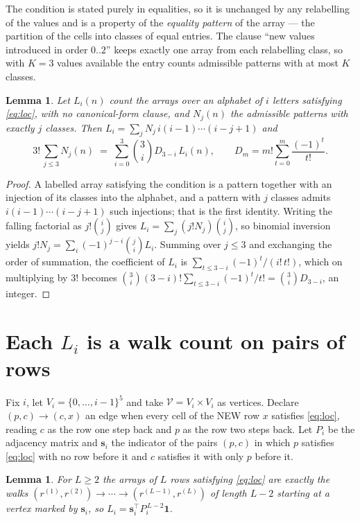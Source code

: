 \documentclass[11pt,a4paper]{article}
\theoremstyle{plain}
\newtheorem{lemma}[theorem]{Lemma}
\theoremstyle{definition}
\begin{document}
The condition is stated purely in equalities, so it is unchanged by any relabelling of the
values and is a property of the \emph{equality pattern} of the array --- the partition of
the cells into classes of equal entries. The clause ``new values introduced in order
$0..2$'' keeps exactly one array from each relabelling class, so with $K=3$ values
available the entry counts admissible patterns with at most $K$ classes.

\begin{lemma}\label{lem:inv}
Let $L_i(n)$ count the arrays over an alphabet of $i$ letters satisfying \eqref{eq:loc},
with no canonical-form clause, and $N_j(n)$ the admissible patterns with exactly $j$ classes.
Then $L_i=\sum_j N_j\,i(i-1)\cdots(i-j+1)$ and
\[
3!\,\sum_{j\le 3}N_j(n)\;=\;\sum_{i=0}^{3}\binom{3}{i}D_{3-i}\,L_i(n),
\qquad D_m=m!\sum_{t=0}^{m}\frac{(-1)^t}{t!} .
\]
\end{lemma}

\begin{proof}
A labelled array satisfying the condition is a pattern together with an injection of its
classes into the alphabet, and a pattern with $j$ classes admits $i(i-1)\cdots(i-j+1)$ such
injections; that is the first identity. Writing the falling factorial as $j!\binom{i}{j}$
gives $L_i=\sum_j(j!N_j)\binom{i}{j}$, so binomial inversion yields
$j!N_j=\sum_i(-1)^{j-i}\binom{j}{i}L_i$. Summing over $j\le3$ and exchanging the
order of summation, the coefficient of $L_i$ is $\sum_{t\le3-i}(-1)^t/(i!\,t!)$, which on
multiplying by $3!$ becomes
$\binom{3}{i}(3-i)!\sum_{t\le3-i}(-1)^t/t!=\binom{3}{i}D_{3-i}$, an
integer.
\end{proof}

\section{Each $L_i$ is a walk count on pairs of rows}

Fix $i$, let $V_i=\{0,\dots,i-1\}^{5}$ and take $\mathcal V=V_i\times V_i$ as vertices.
Declare $(p,c)\to(c,x)$ an edge when every cell of the NEW row $x$ satisfies
\eqref{eq:loc}, reading $c$ as the row one step back and $p$ as the row two steps
back. Let $P_i$ be the adjacency matrix and $\mathbf{s}_i$ the indicator of the pairs
$(p,c)$ in which $p$ satisfies \eqref{eq:loc} with no row before it and $c$ satisfies it
with only $p$ before it.

\begin{lemma}\label{lem:walk}
For $L\ge2$ the arrays of $L$ rows satisfying \eqref{eq:loc} are exactly the walks
$(r^{(1)},r^{(2)})\to\cdots\to(r^{(L-1)},r^{(L)})$ of length $L-2$ starting at a
vertex marked by $\mathbf{s}_i$, so
$L_i=\mathbf{s}_i^{\!\top}P_i^{\,L-2}\mathbf{1}$.
\end{lemma}
\end{document}

